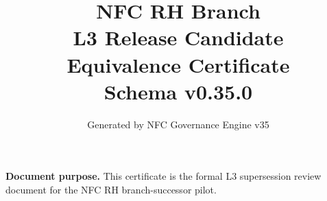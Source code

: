 \documentclass[11pt]{article}
\title{NFC RH Branch\\L3 Release Candidate\\Equivalence Certificate\\[1ex]\large Schema v0.35.0}
\author{Generated by NFC Governance Engine v35}
\date{}
\begin{document}
\maketitle
\tableofcontents
\bigskip
\noindent\textbf{Document purpose.} This certificate is the formal L3 supersession
review document for the NFC RH branch-successor pilot.
\vspace{1em}

\end{document}
